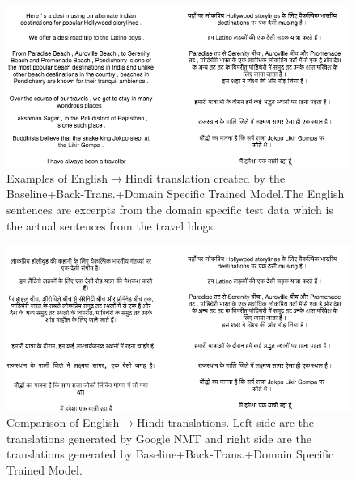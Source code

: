 \begin{figure}[H]
\includegraphics[width=\textwidth]{figures/translations1.png}
\caption{Examples of English$\rightarrow$Hindi translation created by the Baseline+Back-Trans.+Domain Specific Trained Model.The English sentences are excerpts from the domain specific test data which is the actual sentences from the travel blogs.}
\label{translations1}
\end{figure}

\begin{figure}[H]
\includegraphics[width=\textwidth]{figures/translation2.png}
\caption{Comparison of English$\rightarrow$Hindi translations. Left side are the translations generated by Google NMT and right side are the translations generated by Baseline+Back-Trans.+Domain Specific Trained Model.} 
\label{translations2}
\end{figure}


